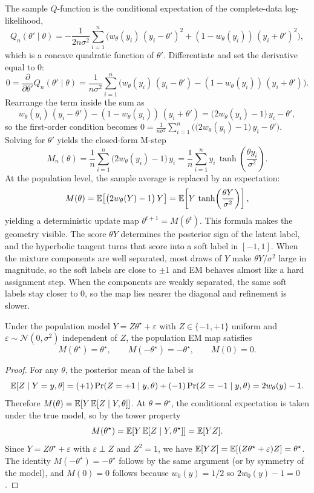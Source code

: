 \documentclass[11pt]{article}
\begin{document}
The sample $Q$-function is the conditional expectation of the complete-data log-likelihood,
\[
Q_n(\theta'\mid\theta)
=
-\frac{1}{2n\sigma^2}\sum_{i=1}^n\Big(
w_\theta(y_i)\,(y_i-\theta')^2 + (1-w_\theta(y_i))\,(y_i+\theta')^2
\Big),
\]
which is a concave quadratic function of $\theta'$.
Differentiate and set the derivative equal to $0$:
\[
0
=
\frac{\partial}{\partial \theta'}Q_n(\theta'\mid\theta)
=
\frac{1}{n\sigma^2}\sum_{i=1}^n\Big(
w_\theta(y_i)\,(y_i-\theta') - (1-w_\theta(y_i))\,(y_i+\theta')
\Big).
\]
Rearrange the term inside the sum as
\[
w_\theta(y_i)\,(y_i-\theta') - (1-w_\theta(y_i))\,(y_i+\theta')
=
\big(2w_\theta(y_i)-1\big)\,y_i-\theta',
\]
so the first-order condition becomes $0=\frac{1}{n\sigma^2}\sum_{i=1}^n\big(\big(2w_\theta(y_i)-1\big)\,y_i-\theta'\big)$.
Solving for $\theta'$ yields the closed-form M-step
\[
M_n(\theta)
=
\frac{1}{n}\sum_{i=1}^n \big(2w_\theta(y_i)-1\big)\,y_i
=
\frac{1}{n}\sum_{i=1}^n y_i\,\tanh\!\left(\frac{\theta y_i}{\sigma^2}\right).
\]
At the population level, the sample average is replaced by an expectation:
\[
M(\theta)
=
\mathbb{E}\!\left[\big(2w_\theta(Y)-1\big)\,Y\right]
=
\mathbb{E}\!\left[Y\,\tanh\!\left(\frac{\theta Y}{\sigma^2}\right)\right],
\]
yielding a deterministic update map $\theta^{t+1}=M(\theta^t)$.
This formula makes the geometry visible.
The score $\theta Y$ determines the posterior sign of the latent label, and the hyperbolic tangent turns that score into a soft label in $[-1,1]$.
When the mixture components are well separated, most draws of $Y$ make $\theta Y/\sigma^2$ large in magnitude, so the soft labels are close to $\pm 1$ and EM behaves almost like a hard assignment step.
When the components are weakly separated, the same soft labels stay closer to $0$, so the map lies nearer the diagonal and refinement is slower.

\begin{lemma}
\label{lem:gmm-fixed-points}
Under the population model $Y=Z\theta^\star+\varepsilon$ with $Z\in\{-1,+1\}$ uniform and $\varepsilon\sim \mathcal{N}(0,\sigma^2)$ independent of $Z$, the population EM map satisfies
\[
M(\theta^\star)=\theta^\star,
\qquad
M(-\theta^\star)=-\theta^\star,
\qquad
M(0)=0.
\]
\end{lemma}

\begin{proof}
For any $\theta$, the posterior mean of the label is
\[
\mathbb{E}[Z\mid Y=y,\theta]
= (+1)\Pr(Z=+1\mid y,\theta) + (-1)\Pr(Z=-1\mid y,\theta)
=2w_\theta(y)-1.
\]
Therefore $M(\theta)=\mathbb{E}\!\left[Y\,\mathbb{E}[Z\mid Y,\theta]\right]$.
At $\theta=\theta^\star$, the conditional expectation is taken under the true model, so by the tower property
\[
M(\theta^\star)
=\mathbb{E}\!\left[Y\,\mathbb{E}[Z\mid Y,\theta^\star]\right]
=\mathbb{E}[YZ].
\]
Since $Y=Z\theta^\star+\varepsilon$ with $\varepsilon\perp Z$ and $Z^2=1$, we have $\mathbb{E}[YZ]=\mathbb{E}[(Z\theta^\star+\varepsilon)Z]=\theta^\star$.
The identity $M(-\theta^\star)=-\theta^\star$ follows by the same argument (or by symmetry of the model), and $M(0)=0$ follows because $w_0(y)=1/2$ so $2w_0(y)-1=0$.
\end{proof}
\end{document}
